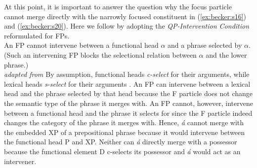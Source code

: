 \documentclass[output=paper,
modfonts
]{langscibook}
\begin{document}
At this point, it is important to answer the question why the focus particle cannot merge directly with the narrowly focused constituent in (\ref{ex:becker:s16}) and (\ref{ex:becker:s20}). Here we follow \citet{Cable2010} by adopting the {\em QP-Intervention Condition} reformulated for FPs.
\label{s21}\\
An FP cannot intervene between a functional head $\alpha$ and a phrase selected by $\alpha$. (Such an intervening FP blocks the selectional relation between $\alpha$ and the lower phrase.) \\ \hspace*{0pt} \hfill {\em adapted from \citet[][57]{Cable2010}}
\z
By assumption, functional heads {\em c-select} for their arguments, while lexical heads {\em s-select} for their arguments \citep[][62]{Cable2010}. An FP can intervene between a lexical head and the phrase selected by that head because the F particle does not change the semantic type of the phrase it merges with. An FP cannot, however, intervene between a functional head and the phrase it selects for since the F particle indeed changes the category of the phrase it merges with. Hence, {\em \'a} cannot merge with the embedded XP of a prepositional phrase because it would intervene between the functional head P and XP. Neither can {\em \'a} directly merge with a possessor because the functional element D c-selects its possessor and {\em \'a} would act as an intervener.
\end{document}
